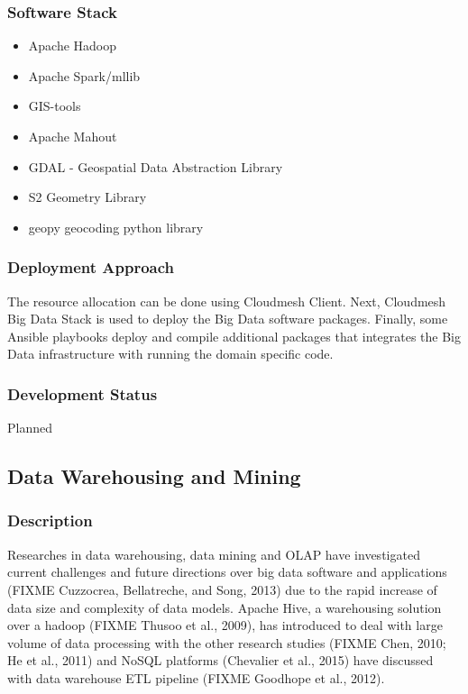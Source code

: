 \documentclass[9pt,twocolumn,twoside]{styles/osajnl}
\begin{document}
\subsubsection{Software Stack}

\begin{itemize}
\item Apache Hadoop
\item Apache Spark/mllib
\item GIS-tools
\item Apache Mahout
\item GDAL - Geospatial Data Abstraction Library
\item S2 Geometry Library
\item geopy geocoding python library
\end{itemize}

\subsubsection{Deployment Approach}

The resource allocation can be done using Cloudmesh Client.  Next,
Cloudmesh Big Data Stack is used to deploy the Big Data software
packages.  Finally, some Ansible playbooks deploy and compile
additional packages that integrates the Big Data infrastructure with
running the domain specific code.

\subsubsection{Development Status}

Planned



\subsection{Data Warehousing and Mining}

\subsubsection{Description}

Researches in data warehousing, data mining and OLAP have investigated
current challenges and future directions over big data software and
applications (FIXME Cuzzocrea, Bellatreche, and Song, 2013) due to the rapid
increase of data size and complexity of data models. Apache Hive, a
warehousing solution over a hadoop (FIXME Thusoo et al., 2009), has
introduced to deal with large volume of data processing with the other
research studies (FIXME Chen, 2010; He et al., 2011) and NoSQL platforms
(Chevalier et al., 2015) have discussed with data warehouse ETL
pipeline (FIXME Goodhope et al., 2012).
\end{document}
